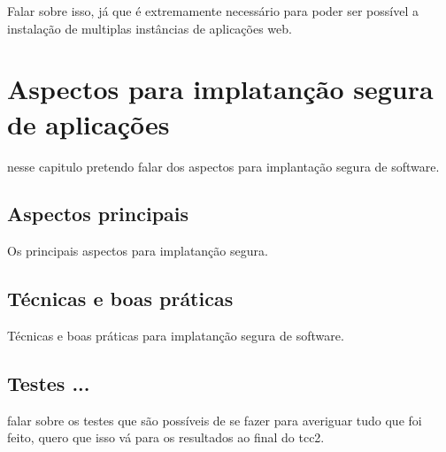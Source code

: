Falar sobre isso, já que é extremamente necessário para poder ser possível a
instalação de multiplas instâncias de aplicações web.



\section{Aspectos para implatanção segura de aplicações}
\label{cap-seguranca}

nesse capitulo pretendo falar dos aspectos para implantação segura de software.

\subsection{Aspectos principais}

Os principais aspectos para implatanção segura.

\subsection{Técnicas e boas práticas}

Técnicas e boas práticas para implatanção segura de software.

\subsection{Testes ...}

falar sobre os testes que são possíveis de se fazer para averiguar tudo que foi
feito, quero que isso vá para os resultados ao final do tcc2.

%
